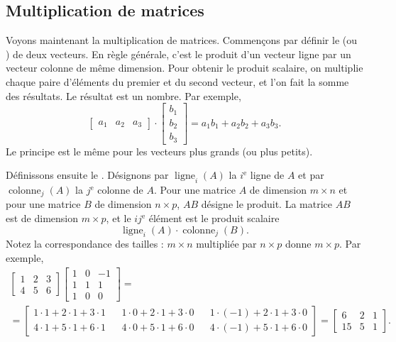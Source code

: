 \subsection{Multiplication de matrices}

Voyons maintenant la multiplication de matrices. Commençons par définir le
\emph{} (ou \emph{}) de deux vecteurs. En règle générale, c'est le produit d'un vecteur ligne par un vecteur colonne de même dimension. Pour obtenir le produit scalaire, on multiplie chaque paire d'éléments du premier et du second vecteur, et l'on fait la somme des résultats. Le résultat est un nombre. Par exemple,
\begin{equation*}
\begin{bmatrix}
a_1 & a_2 & a_3
\end{bmatrix}
\cdot
\begin{bmatrix}
b_1 \\
b_2 \\
b_3
\end{bmatrix}
= a_1 b_1 + a_2 b_2 + a_3 b_3 .
\end{equation*}
Le principe est le même pour les vecteurs plus grands (ou plus petits).

Définissons ensuite le \emph{}. Désignons par $\operatorname{ligne}_i(A)$ la $i^{\text{e}}$ ligne
de $A$ et par
$\operatorname{colonne}_j(A)$ la $j^{\text{e}}$ colonne de $A$.
Pour une matrice $A$ de dimension $m \times n$ et pour une matrice $B$ de dimension $n \times p$,
$AB$ désigne le produit. La matrice $AB$ est de dimension $m \times p$,
et le $ij^{\text{e}}$ élément est le produit scalaire
\begin{equation*}
\operatorname{ligne}_i(A) \cdot
\operatorname{colonne}_j(B) .
\end{equation*}
Notez la correspondance des tailles : $m \times n$ multipliée par $n \times p$ donne 
$m \times p$. Par exemple,
\begin{multline*}
\begin{bmatrix}
1 & 2 & 3 \\
4 & 5 & 6
\end{bmatrix}
\begin{bmatrix}
1 & 0 & -1 \\
1 & 1 & 1 \\
1 & 0 & 0
\end{bmatrix}
= \\ =
\begin{bmatrix}
1\cdot 1 + 2\cdot 1 + 3 \cdot 1 & &
1\cdot 0 + 2\cdot 1 + 3 \cdot 0 & &
1\cdot (-1) + 2\cdot 1 + 3 \cdot 0 \\
4\cdot 1 + 5\cdot 1 + 6 \cdot 1 & &
4\cdot 0 + 5\cdot 1 + 6 \cdot 0 & &
4\cdot (-1) + 5\cdot 1 + 6 \cdot 0
\end{bmatrix}
=
\begin{bmatrix}
6 & 2 & 1 \\
15 & 5 & 1
\end{bmatrix}.
\end{multline*}

